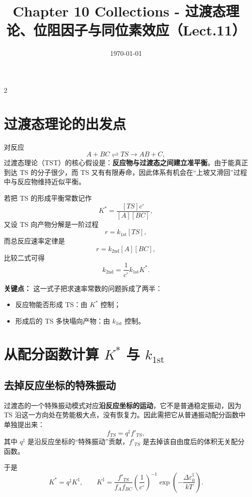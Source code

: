 \documentclass[a4paper,9pt]{article}
\title{\vspace{-2em}\Large\bfseries\color{sectioncolor} Chapter 10 Collections - 过渡态理论、位阻因子与同位素效应（Lect.11）\vspace{-1em}}
\author{}
\date{\today}
\newenvironment{keypoint}
{\par\vspace{0.3em}\noindent\begin{tcolorbox}[colback=keybg,colframe=keycolor,boxrule=0.5pt,arc=2pt,left=2pt,right=2pt,top=2pt,bottom=2pt,boxsep=0pt]\noindent\textcolor{keycolor}{\textbf{关键点：}}}
{\end{tcolorbox}\par\vspace{0.3em}}
\begin{document}
\maketitle
\thispagestyle{fancy}

\begin{multicols}{2}
\scriptsize{\tableofcontents}

\section{过渡态理论的出发点}

对反应
\[
A+BC\rightleftharpoons TS \rightarrow AB+C,
\]
过渡态理论（TST）的核心假设是：\textbf{反应物与过渡态之间建立准平衡}。由于能真正到达 TS 的分子很少，而 TS 又有有限寿命，因此体系有机会在“上坡又滑回”过程中与反应物维持近似平衡。

若把 TS 的形成平衡常数记作
\[
K^*=\frac{[TS]c^\circ}{[A][BC]},
\]
又设 TS 向产物分解是一阶过程
\[
r=k_{1\mathrm{st}}[TS],
\]
而总反应速率定律是
\[
r=k_{2\mathrm{nd}}[A][BC],
\]
比较二式可得
\[
k_{2\mathrm{nd}}=\frac{1}{c^\circ}k_{1\mathrm{st}}K^*.
\]

\begin{keypoint}
这一式子把求速率常数的问题拆成了两半：
\begin{itemize}
  \item 反应物能否形成 TS：由 $K^*$ 控制；
  \item 形成后的 TS 多快塌向产物：由 $k_{1\mathrm{st}}$ 控制。
\end{itemize}
\end{keypoint}

\section{从配分函数计算 $K^*$ 与 $k_{1\mathrm{st}}$}

\subsection{去掉反应坐标的特殊振动}
过渡态的一个特殊振动模式对应\textbf{沿反应坐标的运动}，它不是普通稳定振动，因为 TS 沿这一方向处在势能极大点，没有恢复力。因此需把它从普通振动配分函数中单独提出来：
\[
f_{TS}=q^{\ddagger}f'_{TS},
\]
其中 $q^{\ddagger}$ 是沿反应坐标的“特殊振动”贡献，$f'_{TS}$ 是去掉该自由度后的体积无关配分函数。

于是
\[
K^*=q^{\ddagger}K^{\ddagger},
\qquad
K^{\ddagger}=\frac{f'_{TS}}{f_Af_{BC}}\left(\frac{1}{c^\circ}\right)^{-1}
\exp\left(-\frac{\Delta\varepsilon_0^{\ddagger}}{kT}\right).
\]


\end{multicols}
\end{document}
